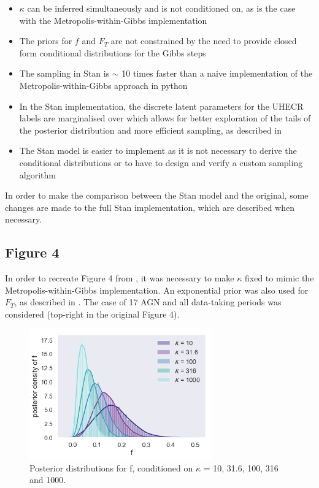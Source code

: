 \documentclass[fontsize=12pt]{article}
\begin{document}
\begin{itemize}
\item $\kappa$ can be inferred simultaneously and is not conditioned on, as is the case with the Metropolis-within-Gibbs implementation
\item The priors for $f$ and $F_T$ are not constrained by the need to provide closed form conditional distributions for the Gibbs steps
\item The sampling in Stan is $\sim$ 10 times faster than a naive implementation of the Metropolis-within-Gibbs approach in python 
\item In the Stan implementation, the discrete latent parameters for the UHECR labels are marginalised over which allows for better exploration of the tails of the posterior distribution and more efficient sampling, as described in \cite{stan_manual}
\item The Stan model is easier to implement as it is not necessary to derive the conditional distributions or to have to design and verify a custom sampling algorithm   
\end{itemize} 

In order to make the comparison between the Stan model and the original, some changes are made to the full Stan implementation, which are described when necessary.

\subsection{Figure 4}

In order to recreate Figure 4 from \cite{soiaporn}, it was necessary to make $\kappa$ fixed to mimic the Metropolis-within-Gibbs implementation. An exponential prior was also used for $F_T$, as described in \cite{soiaporn}. The case of 17 AGN and all data-taking periods was considered (top-right in the original Figure 4). 

\begin{figure}[h]
\centering
\includegraphics[width = 0.7\textwidth]{figures/soiaporn_fig4.png}
\caption{Posterior distributions for f, conditioned on $\kappa$ = 10, 31.6, 100, 316 and 1000.}
\end{figure}
\end{document}
